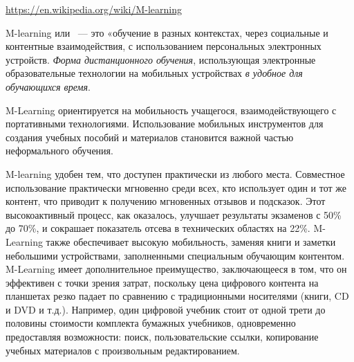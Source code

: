 
\url{https://en.wikipedia.org/wiki/M-learning}

\bigskip
M-learning или \ --- это «обучение в разных контекстах,
через социальные и контентные взаимодействия, с использованием персональных
электронных устройств. \emph{Форма дистанционного обучения}, 
использующая электронные образовательные технологии на мобильных устройствах
\emph{в удобное для обучающихся время}.

M-Learning ориентируется на мобильность учащегося, взаимодействующего с
портативными технологиями. Использование мобильных инструментов для создания
учебных пособий и материалов становится важной частью неформального обучения.

M-learning удобен тем, что доступен практически из любого места. Совместное
использование практически мгновенно среди всех, кто использует один и тот же
контент, что приводит к получению мгновенных отзывов и подсказок. Этот
высокоактивный процесс, как оказалось, улучшает результаты экзаменов с
50\% до 70\%, и сокрашает показатель отсева в
технических областях на 22\%. M-Learning также обеспечивает высокую
мобильность, заменяя книги и заметки небольшими устройствами, заполненными
специальным обучающим контентом. M-Learning имеет дополнительное преимущество,
заключающееся в том, что он эффективен с точки зрения затрат, поскольку цена
цифрового контента на планшетах резко падает по сравнению с традиционными
носителями (книги, CD и DVD и т.д.). Например, один цифровой учебник стоит от
одной трети до половины стоимости комплекта бумажных учебников, одновременно
предоставляя возможности: поиск, пользовательские ссылки, копирование учебных
материалов с произвольным редактированием.
 

